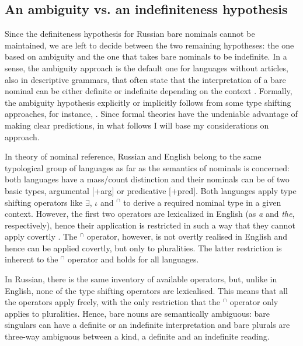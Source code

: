 \documentclass[output=paper,colorlinks,citecolor=brown]{langscibook}
\begin{document}
\subsection{An ambiguity vs. an indefiniteness hypothesis}
\label{ambindef}

Since the definiteness hypothesis for Russian bare nominals cannot be maintained, we are left to decide between the two remaining hypotheses: the one based on ambiguity and the one that takes bare nominals to be indefinite. In a sense, the ambiguity approach is the default one for languages without articles, also in descriptive grammars, that often state that the interpretation of a bare nominal can be either definite or indefinite depending on the context \citep[][]{geist10}. Formally, the ambiguity hypothesis explicitly or implicitly follows from some type shifting approaches, for instance, \citet{chierchia98}. Since formal theories have the undeniable advantage of making clear predictions, in what follows I will base my considerations on  approach. 

In  theory of nominal reference, Russian and English belong to the same typological group of languages as far as the semantics of nominals is concerned: both languages have a mass/count distinction and their nominals can be of two basic types, argumental [+arg] or predicative [+pred]. Both languages apply type shifting operators like $\exists$, $\iota$ and $^{\cap}$ to derive a required nominal type in a given context. However, the first two operators are lexicalized in English (as \textit{a} and \textit{the}, respectively), hence their application is restricted in such a way that they cannot apply covertly \citep[Blocking principle;][360]{chierchia98}. The $^{\cap}$ operator, however, is not overtly realised in English and hence can be applied covertly, but only to pluralities. The latter restriction is inherent to the  $^{\cap}$ operator and holds for all languages. 

In Russian, there is the same inventory of available operators, but, unlike in English, none of the type shifting operators are lexicalised. This means that all the operators apply freely, with the only restriction that the $^{\cap}$ operator only applies to pluralities. Hence, bare nouns are semantically ambiguous: bare singulars can have a definite or an indefinite interpretation and bare plurals are three-way ambiguous between a kind, a definite and an indefinite reading. 
\end{document}

